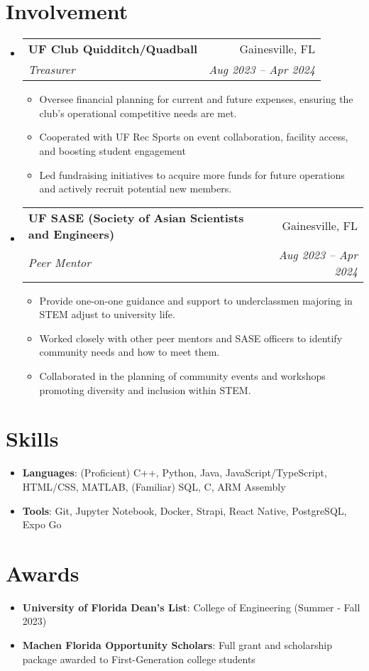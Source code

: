 \documentclass[letterpaper,11pt]{article}
\makeatletter
\newcommand{\resumeItemSkills}[2]{
  \item\normalsize{
    \textbf{#1}{: #2 \vspace{-2pt}}
  }
}
\newcommand{\resumeItemExperience}[1]{
  \item\small{
    {#1 \vspace{-2pt}}
  }
}
\newcommand{\resumeSubheading}[4]{
  \vspace{-1pt}\item
    \begin{tabular*}{0.97\textwidth}{l@{\extracolsep{\fill}}r}
      \textbf{#1} & #2 \\
      \textit{\small#3} & \textit{\small #4} \\
    \end{tabular*}\vspace{-6pt}
}
\newcommand{\resumeSubItemSkills}[2]{\resumeItemSkills{#1}{#2}\vspace{-4pt}}
\newcommand{\resumeSubHeadingListStart}{\begin{itemize}[leftmargin=*, label={}]}
\newcommand{\resumeSubHeadingListStartSkillsAwards}{\begin{itemize}[leftmargin=*]}
\newcommand{\resumeSubHeadingListEnd}{\end{itemize}}
\newcommand{\resumeItemListStart}{\begin{itemize}}
\newcommand{\resumeItemListEnd}{\end{itemize}\vspace{-5pt}}
\makeatother
\begin{document}
\section{Involvement}
    \resumeSubHeadingListStart
      \resumeSubheading
        {UF Club Quidditch/Quadball}{Gainesville, FL}
        {Treasurer}{Aug 2023 -- Apr 2024}
        \resumeItemListStart
          \resumeItemExperience
            {Oversee financial planning for current and future expenses, ensuring the club’s operational competitive needs are met.}
          \resumeItemExperience
            {Cooperated with UF Rec Sports on event collaboration, facility access, and boosting student engagement}
          \resumeItemExperience
            {Led fundraising initiatives to acquire more funds for future operations and actively recruit potential new members.}
        \resumeItemListEnd
        \resumeSubheading
        {UF SASE (Society of Asian Scientists and Engineers)}{Gainesville, FL}
        {Peer Mentor}{Aug 2023 -- Apr 2024}
        \resumeItemListStart
          \resumeItemExperience
            {Provide one-on-one guidance and support to underclassmen majoring in STEM adjust to university life.}
          \resumeItemExperience
            {Worked closely with other peer mentors and SASE officers to identify community needs and how to meet them.}
          \resumeItemExperience
            {Collaborated in the planning of community events and workshops promoting diversity and inclusion within STEM.}
        \resumeItemListEnd
    \resumeSubHeadingListEnd
          
\section{Skills}
  \resumeSubHeadingListStartSkillsAwards
    \resumeSubItemSkills{Languages}{(Proficient) C++, Python, Java, JavaScript/TypeScript, HTML/CSS, MATLAB, \newline
    (Familiar) SQL, C, ARM Assembly}
    \resumeSubItemSkills{Tools}{Git, Jupyter Notebook, Docker, Strapi, React Native, PostgreSQL, Expo Go}
  \resumeSubHeadingListEnd

\section{Awards}
  \resumeSubHeadingListStartSkillsAwards
    \resumeSubItemSkills{University of Florida Dean's List}
      {College of Engineering (Summer - Fall 2023)}
    \resumeSubItemSkills{Machen Florida Opportunity Scholars}
      {Full grant and scholarship package awarded to First-Generation college students}
  \resumeSubHeadingListEnd
\end{document}
